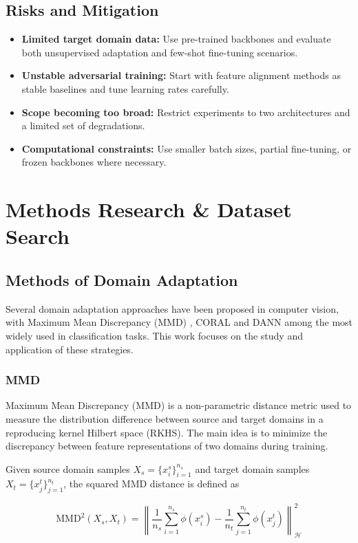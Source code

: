 \documentclass[a4paper,12pt]{extarticle}
\begin{document}
\subsection{Risks and Mitigation}
\begin{itemize}
	\item \textbf{Limited target domain data:} Use pre-trained backbones and evaluate both unsupervised adaptation and few-shot fine-tuning scenarios.
	\item \textbf{Unstable adversarial training:} Start with feature alignment methods as stable baselines and tune learning rates carefully.
	\item \textbf{Scope becoming too broad:} Restrict experiments to two architectures and a limited set of degradations.
	\item \textbf{Computational constraints:} Use smaller batch sizes, partial fine-tuning, or frozen backbones where necessary.
\end{itemize}

\section{Methods Research \& Dataset Search}
\subsection{Methods of Domain Adaptation}
Several domain adaptation approaches have been proposed in computer vision, with Maximum Mean Discrepancy (MMD)
\cite{gretton2012kernel}, CORAL \cite{sun2016deep} and DANN \cite{ganin2016domain} among the most widely used in
classification tasks. This work focuses on the study and application of these strategies.

\subsubsection{MMD}
Maximum Mean Discrepancy (MMD) is a non-parametric distance metric used to measure the distribution difference between
source and target domains in a reproducing kernel Hilbert space (RKHS). The main idea is to minimize the discrepancy
between feature representations of two domains during training.

Given source domain samples $X_s=\{x_i^s\}_{i=1}^{n_s}$ and target domain samples $X_t=\{x_j^t\}_{j=1}^{n_t}$, the
squared MMD distance is defined as

\[
	\text{MMD}^2(X_s,X_t)=\left\|\frac{1}{n_s}\sum_{i=1}^{n_s}\phi(x_i^s)-\frac{1}{n_t}\sum_{j=1}^{n_t}\phi(x_j^t)\right\|_{\mathcal{H}}^2
\]
\end{document}
